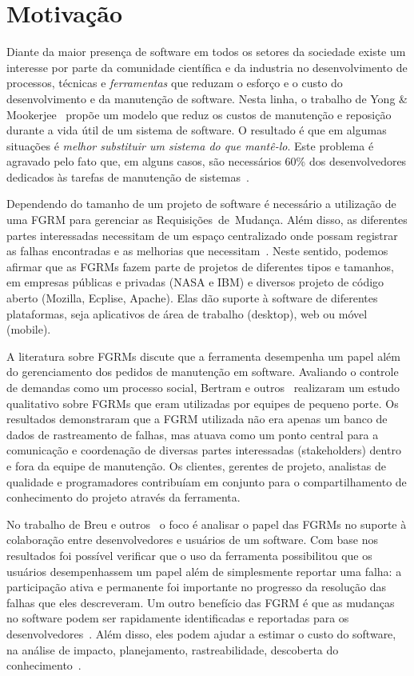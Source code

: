 \section{Motivação}
\label{sec:intro-motivacao}

Diante da maior presença de software em todos os setores da sociedade existe um
interesse por parte da comunidade científica e da industria no desenvolvimento
de processos, técnicas e \textit{ferramentas} que reduzam o esforço e o custo do
desenvolvimento e da manutenção de software. Nesta linha, o trabalho de Yong \&
Mookerjee~\cite{1423995} propõe um modelo que reduz os custos de manutenção e
reposição durante a vida útil de um sistema de software. O resultado é que em
algumas situações é \textit{melhor substituir um sistema do que mantê-lo}. Este
pro\-ble\-ma é agravado pelo fato que, em alguns casos, são necessários 60\% dos
desenvolvedores dedicados às tarefas de manutenção de
sistemas~\cite{Zhang_2003}.

Dependendo do tamanho de um projeto de software é necessário a utilização de uma
FGRM para gerenciar as Requisições~de~Mudança. Além disso, as diferentes partes
interessadas necessitam de um espaço centralizado onde possam registrar as
falhas encontradas e as melhorias que necessitam~\cite{1407819}. Neste sentido,
podemos afirmar que as FGRMs fazem parte de projetos de diferentes tipos e
tamanhos, em empresas públicas e privadas (NASA e IBM) e diversos projeto de
código aberto (Mozilla, Ecplise, Apache). Elas dão suporte à software de
diferentes plataformas, seja aplicativos de área de trabalho (desktop), web ou
móvel (mobile).

A literatura sobre FGRMs discute que a ferramenta desempenha um papel além do
gerenciamento dos pedidos de manutenção em software. Avaliando o controle de
demandas como um processo social, Bertram e
outros~\cite{Bertram:2010:CCB:1718918.1718972} realizaram um estudo qualitativo
sobre FGRMs que eram utilizadas por equipes de pequeno porte. Os resultados
demonstraram que a FGRM utilizada não era apenas um banco de dados de
rastreamento de falhas, mas atuava como um ponto central para a comunicação e
coordenação de diversas partes interessadas (stakeholders) dentro e fora da
equipe de manutenção. Os clientes, gerentes de projeto, analistas de qualidade e
programadores contribuíam em conjunto para o compartilhamento de conhecimento do
projeto através da ferramenta.

No trabalho de Breu e outros~\cite{Breu:2010:INB:1718918.1718973} o foco é
analisar o papel das FGRMs no suporte à colaboração entre desenvolvedores e
usuários de um software. Com base nos resultados foi possível verificar que o
uso da ferramenta possibilitou que os usuários desempenhassem um papel além de
simplesmente reportar uma falha: a participação ativa e permanente foi
importante no progresso da resolução das falhas que eles descreveram. Um outro
benefício das FGRM é que as mudanças no software podem ser rapidamente
identificadas e reportadas para os desenvolvedores~\cite{anvik2005coping}. Além
disso, eles podem ajudar a estimar o custo do software, na análise de impacto,
planejamento, rastreabilidade, descoberta do
conhecimento~\cite{cavalcanti2013bug}.

